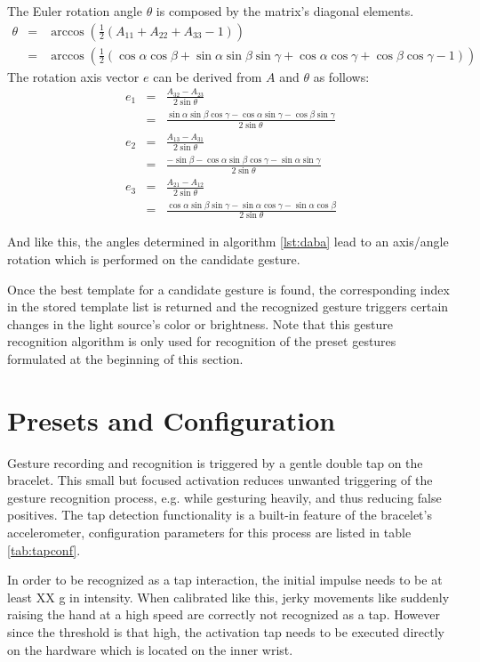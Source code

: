 The Euler rotation angle $ \theta $ is composed by the matrix's diagonal elements.
\begin{eqnarray*} %
\theta & = & \arccos(\frac{1}{2}(A_{11} + A_{22} + A_{33} - 1)) \\
       & = & \arccos(\frac{1}{2}(\cos\alpha\cos\beta+\sin\alpha\sin\beta\sin\gamma+\cos\alpha\cos\gamma+\cos\beta\cos\gamma-1))
\end{eqnarray*}
The rotation axis vector $ e $ can be derived from $ A $ and $ \theta $ as follows:
\begin{eqnarray*}
e_1 & = &  \frac{A_{32} - A_{23}}{2\sin\theta} \\
    & = & \frac{\sin\alpha\sin\beta\cos\gamma-\cos\alpha\sin\gamma-\cos\beta\sin\gamma}{2\sin\theta} \\
e_2 & = & \frac{A_{13} - A_{31}}{2\sin\theta} \\
    & = & \frac{-\sin\beta-\cos\alpha\sin\beta\cos\gamma-\sin\alpha\sin\gamma}{2\sin\theta} \\
e_3 & = & \frac{A_{21} - A_{12}}{2\sin\theta} \\
    & = & \frac{\cos\alpha\sin\beta\sin\gamma-\sin\alpha\cos\gamma-\sin\alpha\cos\beta}{2\sin\theta}
\end{eqnarray*}

And like this, the angles determined in algorithm \ref{lst:daba} lead to an axis/angle rotation which is performed on the candidate gesture.

Once the best template for a candidate gesture is found, the corresponding index in the stored template list is returned and the recognized gesture triggers certain changes in the light source's color or brightness. Note that this gesture recognition algorithm is only used for recognition of the preset gestures formulated at the beginning of this section.


\section{Presets and Configuration}
\label{sec:config}
Gesture recording and recognition is triggered by a gentle double tap on the bracelet. This small but focused activation reduces unwanted triggering of the gesture recognition process, e.g. while gesturing heavily, and thus reducing false positives. The tap detection functionality is a built-in feature of the bracelet's accelerometer, configuration parameters for this process are listed in table \ref{tab:tapconf}.

In order to be recognized as a tap interaction, the initial impulse needs to be at least XX g in intensity. When calibrated like this, jerky movements like suddenly raising the hand at a high speed are correctly not recognized as a tap. However since the threshold is that high, the activation tap needs to be executed directly on the hardware which is located on the inner wrist.

